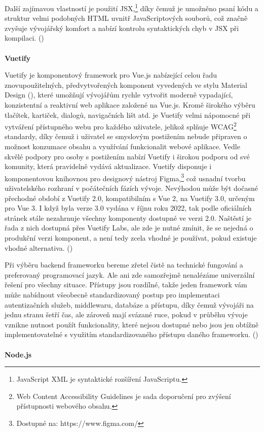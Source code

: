 \documentclass[twoside, 12pt]{article}
\begin{document}
Další zajímavou vlastností je použití JSX,\footnote{JavaScript XML je syntaktické rozšíření JavaScriptu.} díky čemuž je umožněno psaní kódu a struktur velmi podobných HTML uvnitř JavaScriptových souborů, což značně zvyšuje vývojářský komfort a nabízí kontrolu syntaktických chyb v JSX při kompilaci. (\cite{ReactJSX})
\\
\\
\textbf{Vuetify}

Vuetify je komponentový framework pro Vue.js nabízející celou řadu znovupoužitelných, předvytvořených komponent vyvedených ve stylu Material Design (\cite{VuetifyMaterialDesign}), které umožňují vývojářům rychle vytvořit moderně vypadající, konzistentní a reaktivní web aplikace založené na Vue.js. Kromě širokého výběru tlačítek, kartiček, dialogů, navigačních lišt atd. je Vuetify velmi nápomocné při vytváření přístupného webu pro každého uživatele, jelikož splňuje WCAG\footnote{Web Content Accessibility Guidelines je sada doporučení pro zvýšení přístupnosti webového obsahu.} standardy, díky čemuž i uživatel se smyslovým postižením nebude připraven o možnost konzumace obsahu a využívání funkcionalit webové aplikace. Vedle skvělé podpory pro osoby s postižením nabízí Vuetify i širokou podporu od své komunity, která pravidelně vydává aktualizace. Vuetify disponuje i komponentovou knihovnou pro designový nástroj Figma,\footnote{Dostupné na: https://www.figma.com/} což usnadní tvorbu uživatelského rozhraní v počátečních fázích vývoje. Nevýhodou může být dočasné přechodné období z Vuetify 2.0, kompatibilním s Vue 2, na Vuetify 3.0, určeným pro Vue 3. I když byla verze 3.0 vydána v říjnu roku 2022, tak podle oficiálních stránek stále nezahrnuje všechny komponenty dostupné ve verzi 2.0. Naštěstí je řada z nich dostupná přes Vuetify Labs, ale zde je nutné zmínit, že se nejedná o produkční verzi komponent, a není tedy zcela vhodné je používat, pokud existuje vhodné alternativa. (\cite{VuetifyAbout})




Při výběru backend frameworku bereme zřetel čistě na technické fungování a preferovaný programovací jazyk. Ale ani zde samozřejmě nenalézáme univerzální řešení pro všechny situace. Přístupy jsou rozdílné, takže jeden framework vám může nabídnout všeobecně standardizovaný postup pro implementaci autentizačních služeb, middlewaru, databáze a přístupu, díky čemuž vývojáři na jednu stranu šetří čas, ale zároveň mají svázané ruce, pokud v průběhu vývoje vznikne nutnost použít funkcionality, které nejsou dostupné nebo jsou jen obtížně implementovatelné s využitím standardizovaného přístupu daného frameworku. (\cite{BEbasic2})
\\
\\
\textbf{Node.js}
\end{document}
